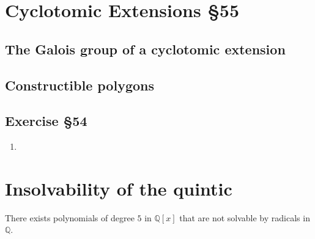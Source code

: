 \section{Cyclotomic Extensions \S55}
\subsection{The Galois group of a cyclotomic extension}
\subsection{Constructible polygons}
\subsection{Exercise \S54}
\begin{enumerate}
	\item
\end{enumerate}

\section{Insolvability of the quintic}
\begin{important}
	There exists polynomials of degree $5$ in $\mathbb{Q}[x]$ that are not solvable by radicals in $\mathbb{Q}$.
\end{important}
